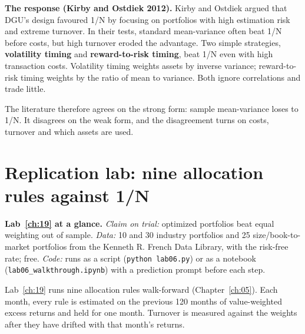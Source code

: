 \textbf{The response (Kirby and Ostdiek 2012).} Kirby and Ostdiek argued that DGU's design favoured 1/N by focusing on portfolios with high estimation risk and extreme turnover. In their tests, standard mean-variance often beat 1/N before costs, but high turnover eroded the advantage. Two simple strategies, \textbf{volatility timing} and \textbf{reward-to-risk timing}, beat 1/N even with high transaction costs. Volatility timing weights assets by inverse variance; reward-to-risk timing weights by the ratio of mean to variance. Both ignore correlations and trade little.

The literature therefore agrees on the strong form: sample mean-variance loses to 1/N. It disagrees on the weak form, and the disagreement turns on costs, turnover and which assets are used.

\section{Replication lab: nine allocation rules against 1/N}
\label{sec:19-lab}

\begin{callout}
\textbf{Lab~\ref{ch:19} at a glance.} \emph{Claim on trial:} optimized portfolios beat equal weighting out of sample. \emph{Data:} 10 and 30 industry portfolios and 25 size/book-to-market portfolios from the Kenneth R. French Data Library, with the risk-free rate; free. \emph{Code:} runs as a script (\texttt{python lab06.py}) or as a notebook (\texttt{lab06\_walkthrough.ipynb}) with a prediction prompt before each step.
\end{callout}

Lab~\ref{ch:19} runs nine allocation rules walk-forward (Chapter~\ref{ch:05}). Each month, every rule is estimated on the previous 120 months of value-weighted excess returns and held for one month. Turnover is measured against the weights after they have drifted with that month's returns.

